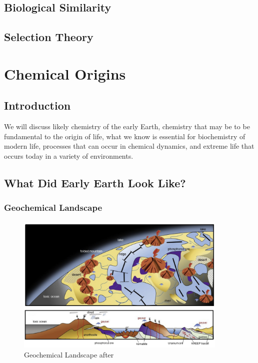 \documentclass[]{article}
\begin{document}
\subsection{Biological Similarity}
\subsection{Selection Theory}
\cite{eigen1978hypercycle} \cite{eigen1988molecular} \cite{eigen2002error} \cite{crotty2001rna} \cite{stadtler2002fitness_landscapes}
\section{Chemical Origins}
\subsection{Introduction}

We will discuss likely chemistry of the early Earth, chemistry that may be to be fundamental to the origin of life, what we know is essential for biochemistry of modern life, processes that can occur in chemical dynamics, and extreme life that occurs today in a variety of environments.


\subsection{What Did Early Earth Look Like?}

\subsubsection{Geochemical Landscape}
\begin{figure}[h!]
	\caption{Geochemical Landscape after \cite{kitadai2018origins}}
	\includegraphics[width=0.9\textwidth]{GeochemicalLandscape}
\end{figure}
\end{document}
